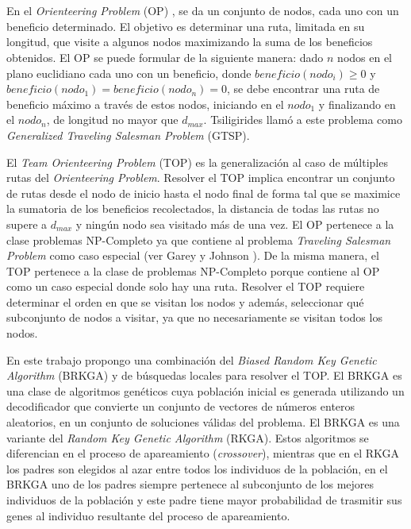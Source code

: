 
\chapter*{\tituloAbstractEs}

\noindent En el \textit{Orienteering Problem} (OP) \cite{Tsiligirides}, se da un conjunto de nodos, cada uno con un beneficio determinado. El objetivo es determinar una ruta, limitada en su longitud, que visite a algunos nodos maximizando la suma de los beneficios obtenidos. El OP se puede formular de la siguiente manera: dado $n$ nodos en el plano euclidiano cada uno con un beneficio, donde $beneficio(nodo_i) \geq 0$ y $beneficio(nodo_1) = beneficio(nodo_n) = 0$, se debe encontrar una ruta de beneficio máximo a través de estos nodos, iniciando en el $nodo_1$ y finalizando en el $nodo_n$, de longitud no mayor que $d_{max}$. Tsiligirides \cite{Tsiligirides} llamó a este problema como \textit{Generalized Traveling Salesman Problem} (GTSP).

\bigskip

El \textit{Team Orienteering Problem} (TOP) \cite{ChaoGoldenWasil} es la generalización al caso de múltiples rutas del \textit{Orienteering Problem}. Resolver el TOP implica encontrar un conjunto de rutas desde el nodo de inicio hasta el nodo final de forma tal que se maximice la sumatoria de los beneficios recolectados, la distancia de todas las rutas no supere a $d_{max}$ y ningún nodo sea visitado más de una vez. El OP pertenece a la clase problemas NP-Completo ya que contiene al problema \textit{Traveling Salesman Problem} como caso especial (ver Garey y Johnson \cite{GareyJohnson}). De la misma manera, el TOP pertenece a la clase de problemas NP-Completo porque contiene al OP como un caso especial donde solo hay una ruta. Resolver el TOP requiere determinar el orden en que se visitan los nodos y además, seleccionar qué subconjunto de nodos a visitar, ya que no necesariamente se visitan todos los nodos.

\bigskip

En este trabajo propongo una combinación del \textit{Biased Random Key Genetic Algorithm} (BRKGA) \cite{Bean} y de búsquedas locales para resolver el TOP. El BRKGA es una clase de algoritmos genéticos cuya población inicial es generada utilizando un decodificador que convierte un conjunto de vectores de números enteros aleatorios, en un conjunto de soluciones válidas del problema. El BRKGA es una variante del \textit{Random Key Genetic Algorithm} (RKGA). Estos algoritmos se diferencian en el proceso de apareamiento (\textit{crossover}), mientras que en el RKGA los padres son elegidos al azar entre todos los individuos de la población, en el BRKGA uno de los padres siempre pertenece al subconjunto de los mejores individuos de la población y este padre tiene mayor probabilidad de trasmitir sus genes al individuo resultante del proceso de apareamiento.

